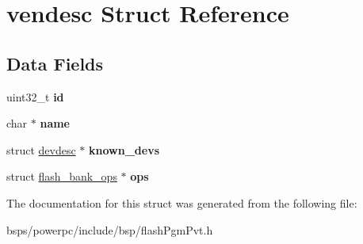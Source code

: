\hypertarget{structvendesc}{}\section{vendesc Struct Reference}
\label{structvendesc}
\subsection*{Data Fields}
\begin{DoxyCompactItemize}
\item 
\mbox{\label{structvendesc_a133440750c9995971ce198b6dc24cc1e}} 
uint32\+\_\+t {\bfseries id}
\item 
\mbox{\label{structvendesc_a2a86e6525e97a427dd4e03b0072bbc25}} 
char $\ast$ {\bfseries name}
\item 
\mbox{\label{structvendesc_acea6ddb5879fbe07735c1e3da7357ba5}} 
struct \mbox{\hyperlink{structdevdesc}{devdesc}} $\ast$ {\bfseries known\+\_\+devs}
\item 
\mbox{\label{structvendesc_a880531e03474e83e9d0aefa52a8b545f}} 
struct \mbox{\hyperlink{structflash__bank__ops}{flash\+\_\+bank\+\_\+ops}} $\ast$ {\bfseries ops}
\end{DoxyCompactItemize}


The documentation for this struct was generated from the following file\+:\begin{DoxyCompactItemize}
\item 
bsps/powerpc/include/bsp/flash\+Pgm\+Pvt.\+h\end{DoxyCompactItemize}
